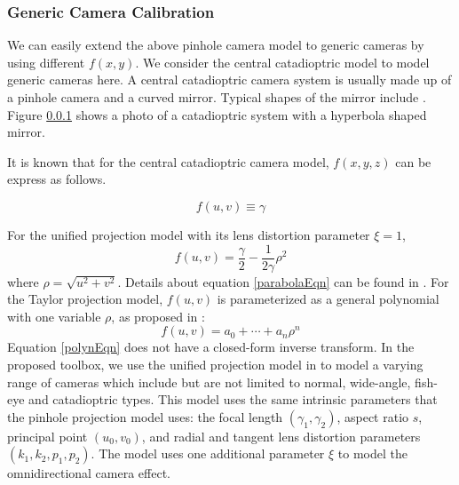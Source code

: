 \documentclass{report}
\begin{document}
\subsubsection{Generic Camera Calibration}


We can easily extend the above pinhole camera model to generic cameras by using different $f(x, y)$. We consider the central catadioptric model to model generic cameras here. A central catadioptric camera system is usually made up of a pinhole camera and a curved mirror. Typical shapes of the mirror include . Figure \ref{} shows a photo of a catadioptric system with a hyperbola shaped mirror. 

It is known \cite{} that for the central catadioptric camera model, $f(x, y, z)$ can be express as follows. 
\begin{equation}
\end{equation}


\begin{equation}
f(u, v) \equiv \gamma
\label{pinholeEqn}
\end{equation}


For the unified projection model with its lens distortion parameter $\xi = 1$,
\begin{equation}
f(u, v) = \frac{\gamma}{2} - \frac{1}{2 \gamma} \rho^2
\label{parabolaEqn}
\end{equation}
where $\rho = \sqrt{u^2 + v^2}$. Details about equation \ref{parabolaEqn} can be found in \cite{mei2007single}. For the Taylor projection model, $f(u, v)$ is parameterized as a general polynomial with one variable $\rho$, as proposed in \cite{scaramuzza2006toolbox}: 
\begin{equation}
f(u, v) = a_0 + \cdots + a_n \rho^n
\label{polynEqn}
\end{equation}
Equation \ref{polynEqn} does not have a closed-form inverse transform. In the proposed toolbox, we use the unified projection model in \cite{mei2007single} to model a varying range of cameras which include but are not limited to normal, wide-angle, fish-eye and catadioptric types. This model uses the same intrinsic parameters that the pinhole projection model uses: the focal length $(\gamma_1, \gamma_2)$, aspect ratio $s$, principal point $(u_0, v_0)$, and radial and tangent lens distortion parameters $(k_1, k_2, p_1, p_2)$. The model uses one additional parameter $\xi$ to model the omnidirectional camera effect. 
\end{document}
